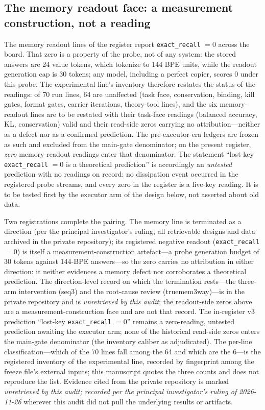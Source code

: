 \documentclass[11pt,a4paper]{article}
\begin{document}
\subsection{The memory readout face: a measurement construction, not a reading}
\label{sec:empirics-readout}

The memory readout lines of the register report \texttt{exact\_recall} $= 0$ across the board. That zero is a property of the probe, not of any system: the stored answers are 24 value tokens, which tokenize to 144 BPE units, while the readout generation cap is 30 tokens; any model, including a perfect copier, scores $0$ under this probe. The experimental line's inventory therefore restates the status of the readings: of 70 run lines, 64 are unaffected (task face, conservation, binding, kill gates, format gates, carrier iterations, theory-tool lines), and the six memory-readout lines are to be restated with their task-face readings (balanced accuracy, KL, conservation) valid and their read-side zeros carrying no attribution---neither as a defect nor as a confirmed prediction. The pre-executor-era ledgers are frozen as such and excluded from the main-gate denominator; on the present register, \emph{zero} memory-readout readings enter that denominator. The statement ``lost-key \texttt{exact\_recall} $= 0$ is a theoretical prediction'' is accordingly an \emph{untested} prediction with no readings on record: no dissipation event occurred in the registered probe streams, and every zero in the register is a live-key reading. It is to be tested first by the executor arm of the design below, not asserted about old data.

Two registrations complete the pairing. The memory line is terminated as a direction (per the principal investigator's ruling, all retrievable designs and data archived in the private repository); its registered negative readout (\texttt{exact\_recall} $= 0$) is itself a measurement-construction artefact---a probe generation budget of 30 tokens against 144-BPE answers---so the zero carries no attribution in either direction: it neither evidences a memory defect nor corroborates a theoretical prediction. The direction-level record on which the termination rests---the three-arm intervention (seq3) and the root-cause review (truemem3way)---is in the private repository and is \emph{unretrieved by this audit}; the readout-side zeros above are a measurement-construction face and are not that record. The in-register v3 prediction ``lost-key \texttt{exact\_recall} $= 0$'' remains a zero-reading, untested prediction awaiting the executor arm; none of the historical read-side zeros enters the main-gate denominator (the inventory caliber as adjudicated). The per-line classification---which of the 70 lines fall among the 64 and which are the 6---is the registered inventory of the experimental line, recorded by fingerprint among the freeze file's external inputs; this manuscript quotes the three counts and does not reproduce the list. Evidence cited from the private repository is marked \emph{unretrieved by this audit; recorded per the principal investigator's ruling of 2026-11-26} wherever this audit did not pull the underlying results or artifacts.
\end{document}
